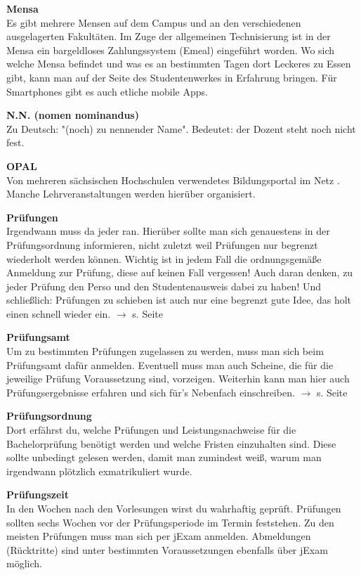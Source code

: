\begin{multicols}{2}
\textbf{Mensa} \\
Es gibt mehrere Mensen auf dem Campus und an den verschiedenen ausgelagerten Fakultäten.
Im Zuge der allgemeinen Technisierung ist in der Mensa ein bargeldloses Zahlungssystem (Emeal) eingeführt worden.
Wo sich welche Mensa befindet und was es an bestimmten Tagen dort Leckeres zu Essen gibt, kann man auf der Seite des Studentenwerkes in Erfahrung bringen. 
Für Smartphones gibt es auch etliche mobile Apps.

\textbf{N.N. (nomen nominandus)} \\
Zu Deutsch:
"(noch) zu nennender Name".
Bedeutet:
der Dozent steht noch nicht fest.

\textbf{OPAL}\\
Von mehreren sächsischen Hochschulen verwendetes Bildungsportal im Netz .
Manche Lehrveranstaltungen werden hierüber organisiert.

\textbf{Prüfungen} \\
Irgendwann muss da jeder ran.
Hierüber sollte man sich genauestens in der Prüfungsordnung informieren, nicht zuletzt weil Prüfungen nur begrenzt wiederholt werden können.
Wichtig ist in jedem Fall die ordnungsgemäße Anmeldung zur Prüfung, diese auf keinen Fall vergessen!
Auch daran denken, zu jeder Prüfung den Perso und den Studentenausweis dabei zu haben!
Und schließlich: Prüfungen zu schieben ist auch nur eine begrenzt gute Idee, das holt einen schnell wieder ein.
$\rightarrow$ s. Seite \pageref{sec:pruefungen}

\textbf{Prüfungsamt} \\
Um zu bestimmten Prüfungen zugelassen zu werden, muss man sich beim Prüfungsamt dafür anmelden.
Eventuell muss man auch Scheine, die für die jeweilige Prüfung Voraussetzung sind, vorzeigen.
Weiterhin kann man hier auch Prüfungsergebnisse erfahren und sich für's Nebenfach einschreiben.
$\rightarrow$ s. Seite \pageref{sec:pruefungsamt}

\textbf{Prüfungsordnung} \\
Dort erfährst du, welche Prüfungen und Leistungsnachweise für die Bachelorprüfung benötigt werden und welche Fristen einzuhalten sind.
Diese sollte unbedingt gelesen werden, damit man zumindest weiß, warum man irgendwann plötzlich exmatrikuliert wurde.

\textbf{Prüfungszeit} \\
In den Wochen nach den Vorlesungen wirst du wahrhaftig geprüft.
Prüfungen sollten sechs Wochen vor der Prüfungsperiode im Termin feststehen.
Zu den meisten Prüfungen muss man sich per jExam anmelden.
Abmeldungen (Rücktritte) sind unter bestimmten Voraussetzungen ebenfalls über jExam möglich.


\end{multicols}
